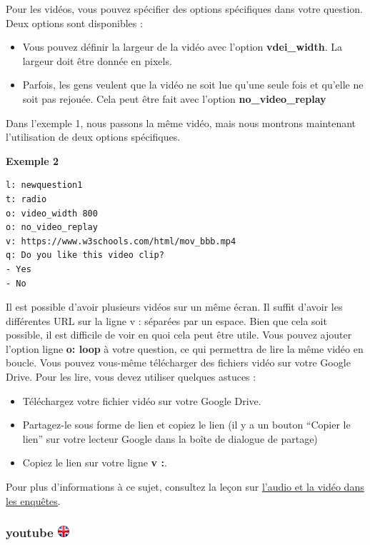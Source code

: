 \documentclass[
]{book}
\providecommand{\tightlist}{%
  \setlength{\itemsep}{0pt}\setlength{\parskip}{0pt}}
\begin{document}
Pour les vidéos, vous pouvez spécifier des options spécifiques dans
votre question. Deux options sont disponibles :

\begin{itemize}
\tightlist
\item
  Vous pouvez définir la largeur de la vidéo avec l'option
  \textbf{vdei\_width}. La largeur doit être donnée en pixels.
\item
  Parfois, les gens veulent que la vidéo ne soit lue qu'une seule fois
  et qu'elle ne soit pas rejouée. Cela peut être fait avec l'option
  \textbf{no\_video\_replay}
\end{itemize}

Dans l'exemple 1, nous passons la même vidéo, mais nous montrons
maintenant l'utilisation de deux options spécifiques.

\textbf{Exemple 2}

\begin{verbatim}
l: newquestion1
t: radio
o: video_width 800
o: no_video_replay
v: https://www.w3schools.com/html/mov_bbb.mp4
q: Do you like this video clip?
- Yes
- No
\end{verbatim}

Il est possible d'avoir plusieurs vidéos sur un même écran. Il suffit
d'avoir les différentes URL sur la ligne v : séparées par un espace.
Bien que cela soit possible, il est difficile de voir en quoi cela peut
être utile. Vous pouvez ajouter l'option ligne \textbf{o: loop} à votre
question, ce qui permettra de lire la même vidéo en boucle. Vous pouvez
vous-même télécharger des fichiers vidéo sur votre Google Drive. Pour
les lire, vous devez utiliser quelques astuces :

\begin{itemize}
\tightlist
\item
  Téléchargez votre fichier vidéo sur votre Google Drive.
\item
  Partagez-le sous forme de lien et copiez le lien (il y a un bouton
  ``Copier le lien'' sur votre lecteur Google dans la boîte de dialogue
  de partage)
\item
  Copiez le lien sur votre ligne \textbf{v :}.
\end{itemize}

Pour plus d'informations à ce sujet, consultez la leçon sur
\protect\hyperlink{s10}{l'audio et la vidéo dans les enquêtes}.

\hypertarget{youtube-ukflag}{%
\subsubsection[youtube ]{\texorpdfstring{youtube
\href{https://www.psytoolkit.org/doc3.1.0/online-survey-syntax.html\#youtube}{\protect\includegraphics{img/ukflag.png}}}{youtube ukflag}}\label{youtube-ukflag}}
\end{document}
